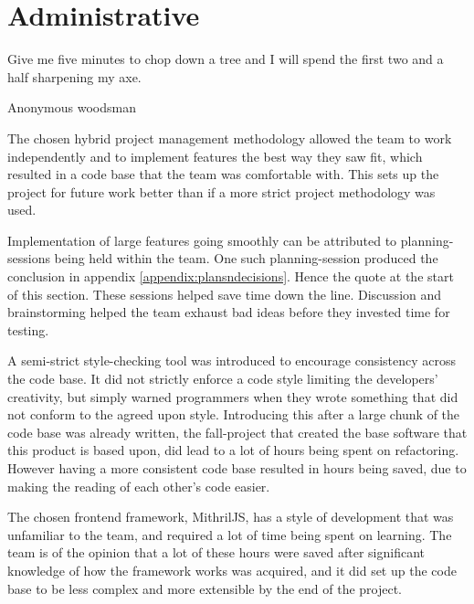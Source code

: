 \section{Administrative}

\vspace{-1cm}\epigraph{Give me five minutes to chop down a tree and I will spend the first two and a half sharpening my axe.}{Anonymous woodsman}


The chosen hybrid project management methodology allowed the team to work independently and to implement features the best way they saw fit, which resulted in a code base that the team was comfortable with. This sets up the project for future work better than if a more strict project methodology was used. 


Implementation of large features going smoothly can be attributed to planning-sessions being held within the team. One such planning-session produced the conclusion in appendix \ref{appendix:plansndecisions}. Hence the quote at the start of this section. These sessions helped save time down the line. Discussion and brainstorming helped the team exhaust bad ideas before they invested time for testing. 

A semi-strict style-checking tool was introduced to encourage consistency across the code base. It did not strictly enforce a code style limiting the developers' creativity, but simply warned programmers when they wrote something that did not conform to the agreed upon style. Introducing this after a large chunk of the code base was already written, the fall-project that created the base software that this product is based upon, did lead to a lot of hours being spent on refactoring. However having a more consistent code base resulted in hours being saved, due to making the reading of each other's code easier. 

The chosen frontend framework, MithrilJS, has a style of development that was unfamiliar to the team, and required a lot of time being spent on learning. The team is of the opinion that a lot of these hours were saved after significant knowledge of how the framework works was acquired, and it did set up the code base to be less complex and more extensible by the end of the project.

